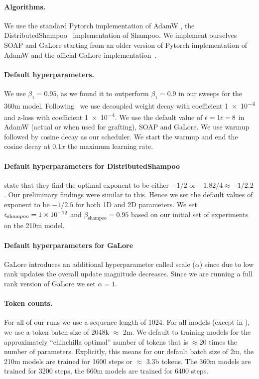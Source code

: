 \documentclass{article} %
\begin{document}
\paragraph{Algorithms.} We use the standard Pytorch implementation of AdamW \citep{paszke2019pytorch}, the DistributedShampoo~\cite{distributedshampoo}  implementation of Shampoo. We implement ourselves SOAP and GaLore starting from an older version of Pytorch implementation of AdamW and the official GaLore implementation~\cite{galoregithub}.

\paragraph{Default hyperparameters.} We use $\beta_1 = 0.95$, as we found it to outperform $\beta_1 = 0.9$ in our sweeps for the 360m model. Following~\citet{wortsman2024smallscale} we use decoupled weight decay with coefficient \num{1e-4} and z-loss with coefficient \num{1e-4}. We use the default value of ${\epsilon} = 1e-8$ in AdamW (actual or when used for grafting), SOAP and GaLore. We use warmup followed by cosine decay as our scheduler.  We start the warmup and end the cosine decay at $0.1x$ the maximum learning rate.


\paragraph{Default hyperparameters for DistributedShampoo} \citet{distributedshampoo} state that they find the optimal exponent to be either $-1/2$ or $-1.82/4 \approx -1/2.2$. Our preliminary findings were similar to this. Hence we set the default values of exponent to be $-1/2.5$ for both 1D and 2D parameters. We set ${\epsilon}_{\text{shampoo}} = \num{1e-12}$ and $\beta_{\text{shampoo}} = 0.95$ based on our initial set of experiments on the 210m model.

\paragraph{Default hyperparameters for GaLore} GaLore introduces an additional hyperparameter called scale ($\alpha$) since due to low rank updates the overall update magnitude decreases. Since we are running a full rank version of GaLore we set $\alpha = 1$.


\paragraph{Token counts.} For all of our runs we use a sequence length of 1024. For all models (except in ), we use a token batch size of 2048k $\approx$ 2m. We default to training models for the approximately ``chinchilla optimal'' number of tokens that is $ \approx$20 times the number of parameters. Explicitly, this means for our default batch size of 2m, the 210m models are trained for 1600 steps or $\approx$ 3.3b tokens. The 360m models are trained for 3200 steps, the 660m models are trained for 6400 steps.
\end{document}
